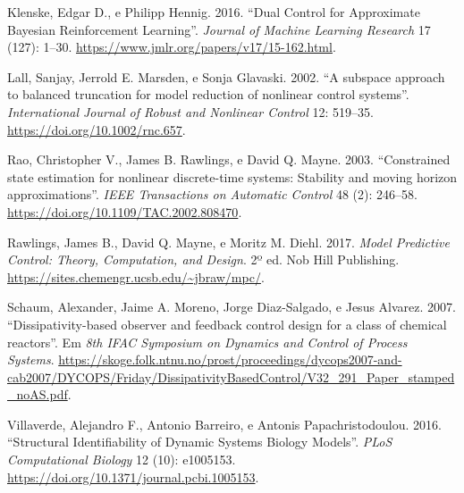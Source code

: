 \documentclass[
  11pt,
]{article}
\newlength{\cslhangindent}
\newlength{\cslentryspacingunit} %
\newenvironment{CSLReferences}[2] %
 {%
  \setlength{\parindent}{0pt}
  \ifodd #1
  \let\oldpar\par
  \def\par{\hangindent=\cslhangindent\oldpar}
  \fi
  \setlength{\parskip}{#2\cslentryspacingunit}
 }%
 {}
\begin{document}
\begin{CSLReferences}{1}{0}
\leavevmode{}%
Klenske, Edgar D., e Philipp Hennig. 2016. {``Dual Control for
Approximate Bayesian Reinforcement Learning''}. \emph{Journal of Machine
Learning Research} 17 (127): 1--30.
\url{https://www.jmlr.org/papers/v17/15-162.html}.

\leavevmode{}%
Lall, Sanjay, Jerrold E. Marsden, e Sonja Glavaski. 2002. {``A subspace
approach to balanced truncation for model reduction of nonlinear control
systems''}. \emph{International Journal of Robust and Nonlinear Control}
12: 519--35. \url{https://doi.org/10.1002/rnc.657}.

\leavevmode{}%
Rao, Christopher V., James B. Rawlings, e David Q. Mayne. 2003.
{``Constrained state estimation for nonlinear discrete-time systems:
Stability and moving horizon approximations''}. \emph{IEEE Transactions
on Automatic Control} 48 (2): 246--58.
\url{https://doi.org/10.1109/TAC.2002.808470}.

\leavevmode{}%
Rawlings, James B., David Q. Mayne, e Moritz M. Diehl. 2017. \emph{Model
Predictive Control: Theory, Computation, and Design}. 2º ed. Nob Hill
Publishing. \url{https://sites.chemengr.ucsb.edu/~jbraw/mpc/}.

\leavevmode{}%
Schaum, Alexander, Jaime A. Moreno, Jorge Diaz-Salgado, e Jesus Alvarez.
2007. {``Dissipativity-based observer and feedback control design for a
class of chemical reactors''}. Em \emph{8th IFAC Symposium on Dynamics
and Control of Process Systems}.
\url{https://skoge.folk.ntnu.no/prost/proceedings/dycops2007-and-cab2007/DYCOPS/Friday/DissipativityBasedControl/V32_291_Paper_stamped_noAS.pdf}.

\leavevmode{}%
Villaverde, Alejandro F., Antonio Barreiro, e Antonis Papachristodoulou.
2016. {``Structural Identifiability of Dynamic Systems Biology
Models''}. \emph{PLoS Computational Biology} 12 (10): e1005153.
\url{https://doi.org/10.1371/journal.pcbi.1005153}.

\end{CSLReferences}
\end{document}

